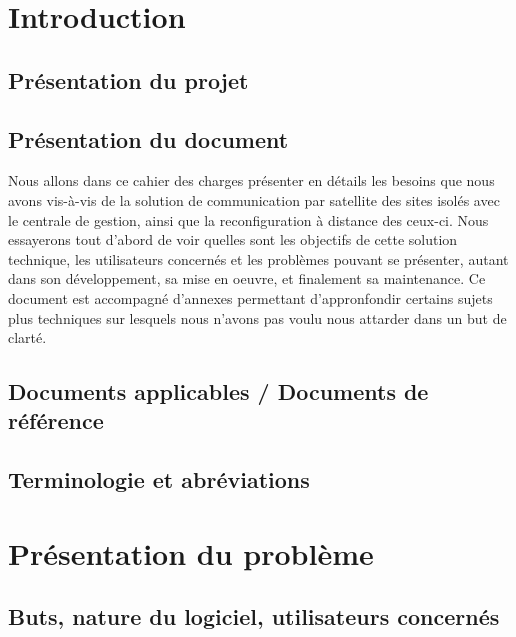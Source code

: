 \section{Introduction}

\subsection{Présentation du projet}


\subsection{Présentation du document}

Nous allons dans ce cahier des charges présenter en détails les besoins que nous avons vis-à-vis de la solution de communication par satellite des sites isolés avec le centrale de gestion, ainsi que la reconfiguration à distance des ceux-ci. Nous essayerons tout d'abord de voir quelles sont les objectifs de cette solution technique, les utilisateurs concernés et les problèmes pouvant se présenter, autant dans son développement, sa mise en oeuvre, et finalement sa maintenance. Ce document est accompagné d'annexes permettant d'appronfondir certains sujets plus techniques sur lesquels nous n'avons pas voulu nous attarder dans un but de clarté.

\subsection{Documents applicables / Documents de référence}


\subsection{Terminologie et abréviations}


\section{Présentation du problème}

\subsection{Buts, nature du logiciel, utilisateurs concernés}

